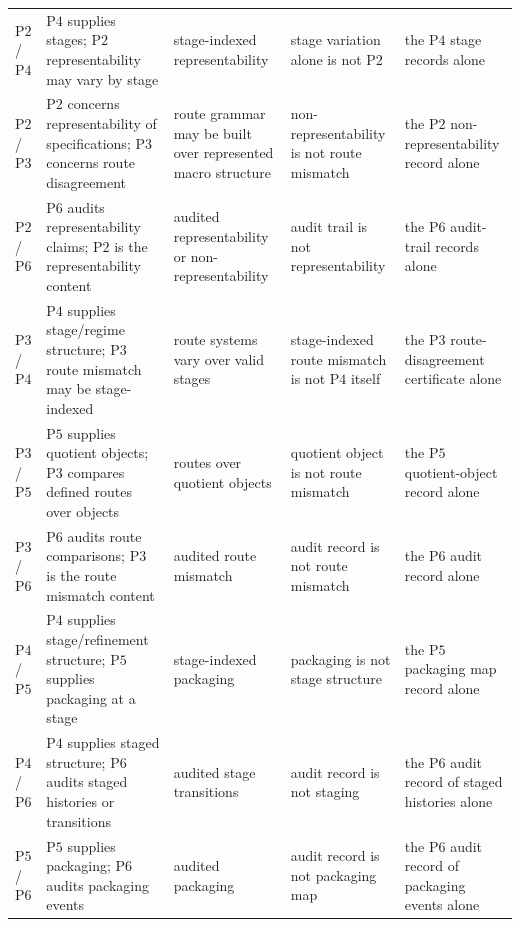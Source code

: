 \documentclass[11pt]{article}
\theoremstyle{definition}
\newcommand{\Ptwo}{\ensuremath{\mathrm{P2}}}
\newcommand{\Pthree}{\ensuremath{\mathrm{P3}}}
\newcommand{\Pfour}{\ensuremath{\mathrm{P4}}}
\newcommand{\Pfive}{\ensuremath{\mathrm{P5}}}
\newcommand{\Psix}{\ensuremath{\mathrm{P6}}}
\begin{document}
\begin{longtable}{@{}>{\raggedright\arraybackslash}p{1.2cm}>{\raggedright\arraybackslash}p{4.3cm}>{\raggedright\arraybackslash}p{3.0cm}>{\raggedright\arraybackslash}p{3.0cm}>{\raggedright\arraybackslash}p{2.9cm}@{}}
\Ptwo{}/\Pfour{} & \Pfour{} supplies stages; \Ptwo{} representability may vary by stage & stage-indexed representability & stage variation alone is not \Ptwo{} & the \Pfour{} stage records alone \\
\Ptwo{}/\Pthree{} & \Ptwo{} concerns representability of specifications; \Pthree{} concerns route disagreement & route grammar may be built over represented macro structure & non-representability is not route mismatch & the \Ptwo{} non-representability record alone \\
\Ptwo{}/\Psix{} & \Psix{} audits representability claims; \Ptwo{} is the representability content & audited representability or non-representability & audit trail is not representability & the \Psix{} audit-trail records alone \\
\Pthree{}/\Pfour{} & \Pfour{} supplies stage/regime structure; \Pthree{} route mismatch may be stage-indexed & route systems vary over valid stages & stage-indexed route mismatch is not \Pfour{} itself & the \Pthree{} route-disagreement certificate alone \\
\Pthree{}/\Pfive{} & \Pfive{} supplies quotient objects; \Pthree{} compares defined routes over objects & routes over quotient objects & quotient object is not route mismatch & the \Pfive{} quotient-object record alone \\
\Pthree{}/\Psix{} & \Psix{} audits route comparisons; \Pthree{} is the route mismatch content & audited route mismatch & audit record is not route mismatch & the \Psix{} audit record alone \\
\Pfour{}/\Pfive{} & \Pfour{} supplies stage/refinement structure; \Pfive{} supplies packaging at a stage & stage-indexed packaging & packaging is not stage structure & the \Pfive{} packaging map record alone \\
\Pfour{}/\Psix{} & \Pfour{} supplies staged structure; \Psix{} audits staged histories or transitions & audited stage transitions & audit record is not staging & the \Psix{} audit record of staged histories alone \\
\Pfive{}/\Psix{} & \Pfive{} supplies packaging; \Psix{} audits packaging events & audited packaging & audit record is not packaging map & the \Psix{} audit record of packaging events alone \\
\end{longtable}
\endgroup
 
\end{document}
